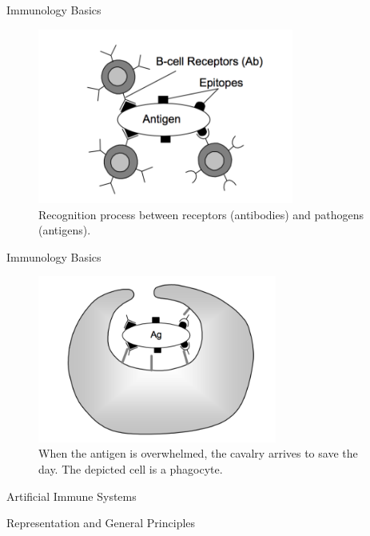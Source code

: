 \documentclass[xcolor=svgnames]{beamer}
\newcommand{\introframe}[2]{
    \begin{frame}
       \vfill
       \hfill\Huge{#1}
       
       \vspace{1em}
       
       \hfill\Large{#2}
       \vfill
    \end{frame}
}
\begin{document}
        \begin{frame}{Immunology Basics}
            \begin{figure}
                \centering
                \includegraphics[width=0.75\textwidth]{fig/recognition}
                \caption{Recognition process between receptors (antibodies) and pathogens (antigens).}
            \end{figure}
        \end{frame}
        
        \begin{frame}{Immunology Basics}
            \begin{figure}
                \centering
                \includegraphics[width=0.7\textwidth]{fig/phagocytosis}
                \caption{When the antigen is overwhelmed, the cavalry arrives to save the day. The depicted cell is a phagocyte.}
            \end{figure}
        \end{frame}
        

    
    
    \introframe{Artificial Immune Systems}{Representation and General Principles}
    
\end{document}

